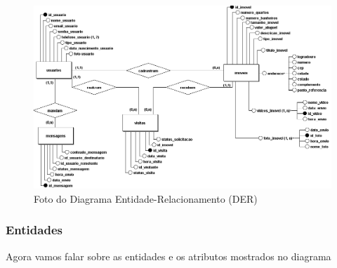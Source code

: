 \begin{figure}[h!] 
    \centering
    \includegraphics[width=\textwidth]{./img/Conceitual.png}
    \caption{Foto do Diagrama Entidade-Relacionamento (DER)}
    \label{fig:exemplo-imagem}
\end{figure}

\subsubsection{Entidades}
Agora vamos falar sobre as entidades e os atributos mostrados no diagrama\\


\setlength{\extrarowheight}{5pt} 

